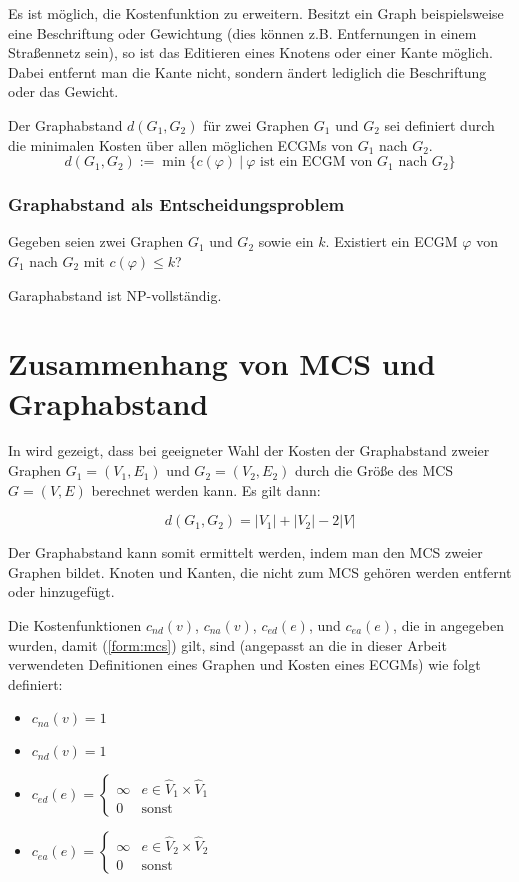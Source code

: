 Es ist möglich, die Kostenfunktion zu erweitern. Besitzt ein Graph 
beispielsweise eine Beschriftung oder Gewichtung (dies können z.B. 
Entfernungen in einem Straßennetz sein), so ist das Editieren eines 
Knotens oder einer Kante möglich. Dabei entfernt man die Kante nicht, 
sondern ändert lediglich die Beschriftung oder das Gewicht. 

\begin{mydef}[Graphabstand]
Der Graphabstand $d(G_1,G_2)$ für zwei Graphen $G_1$ und $G_2$ sei 
definiert durch die minimalen Kosten über allen möglichen ECGMs von $G_1$ 
nach $G_2$.
\[
d(G_1,G_2):=\min\{c(\varphi)\ |\ \varphi \text{ ist ein ECGM von } G_1 
\text{ nach } G_2\}
\]
\end{mydef}

\subsubsection{Graphabstand als Entscheidungsproblem}
Gegeben seien zwei Graphen $G_1$ und $G_2$ sowie ein $k$. Existiert ein 
ECGM $\varphi$ von $G_1$ nach $G_2$ mit $c(\varphi) \leq k$?

Garaphabstand ist NP-vollständig. \cite{GEDisNPcomp}


\section{Zusammenhang von MCS und Graphabstand}\label{sec:MCS_Graphabstand}
In \cite{Bunke:1997} wird gezeigt, dass bei geeigneter Wahl der Kosten 
der Graphabstand zweier Graphen $G_1=(V_1,E_1)$ und $G_2=(V_2,E_2)$ 
durch die Größe des MCS $G=(V,E)$ berechnet werden kann. Es gilt dann:

\begin{equation}
d(G_1,G_2)=|V_1| + |V_2| - 2 |V|\label{form:mcs}
\end{equation}

Der Graphabstand kann somit ermittelt werden, indem man den MCS zweier 
Graphen bildet. Knoten und Kanten, die nicht zum MCS gehören werden entfernt 
oder hinzugefügt.

Die Kostenfunktionen $c_{nd}(v)$, $c_{na}(v)$, $c_{ed}(e)$, und $c_{ea}(e)$, 
die in \cite{Bunke:1997} angegeben wurden, damit (\ref{form:mcs}) gilt, sind 
(angepasst an die in dieser Arbeit verwendeten Definitionen eines 
Graphen und Kosten eines ECGMs) wie folgt definiert:

\begin{itemize}
	\item $c_{na}(v)=1$
	\item $c_{nd}(v)=1$
	\item $c_{ed}(e)=\left\{\begin{array}{ll}\infty & e \in \hat{V}_1 \times 
	                  \hat{V}_1\\0 & \text{sonst}\end{array}\right. $
	\item $c_{ea}(e)=\left\{\begin{array}{ll}\infty & e \in \hat{V}_2 \times 
	                  \hat{V}_2\\0 & \text{sonst}\end{array}\right. $
\end{itemize}

